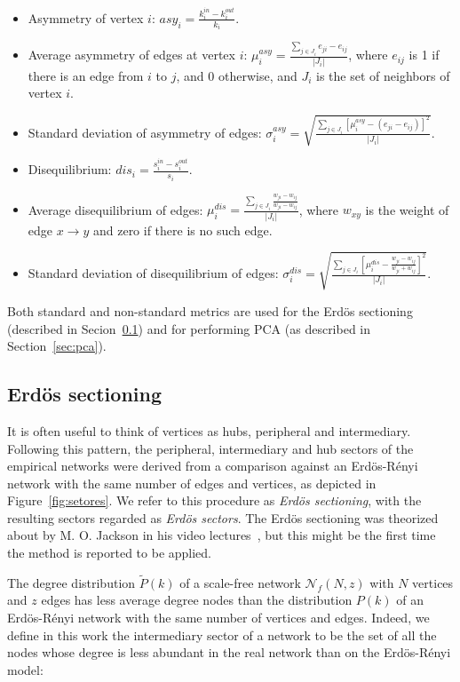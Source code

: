 \documentclass[%
	aip,
	jmp,%
	amsmath,amssymb,
	reprint,%
]{revtex4-1}
\begin{document}
\begin{itemize}
	\item Asymmetry of vertex $i$: $asy_i=\frac{k_i^{in}-k_i^{out}}{k_i}$.
	\item Average asymmetry of edges at vertex $i$: $\mu_i^{asy}=\frac{\sum_{j\in J_i} e_{ji}-e_{ij}}{|J_i|}$, where $e_{ij}$ is 1 if there is an edge from $i$ to $j$, and $0$ otherwise, and $J_i$ is the set of neighbors of vertex $i$.
	\item Standard deviation of asymmetry of edges: $\sigma_i^{asy}=\sqrt{\frac{\sum_{j\in J_i}[\mu^{asy}_i -(e_{ji}-e_{ij}) ]^2  }{|J_i|}  }$.
	\item Disequilibrium: $dis_i=\frac{s_i^{in}-s_i^{out}}{s_i}$.
	\item Average disequilibrium of edges: $\mu_i^{dis}=\frac{\sum_{j \in J_i}\frac{w_{ji}-w_{ij}}{w_{ji}-w_{ij}}}{|J_i|}$, where $w_{xy}$ is the weight of edge $x\rightarrow y$ and zero if there is no such edge.
	\item Standard deviation of disequilibrium of edges: $\sigma_i^{dis}=\sqrt{\frac{\sum_{j\in J_i}\left[\mu^{dis}_i-\frac{w_{ji}-w_{ij}}{w_{ji}+w_{ij}}\right]^2}{|J_i|}}$.
\end{itemize}

Both standard and non-standard metrics are used for the Erd\"os sectioning (described in Secion~\ref{sectioning}) and for performing PCA (as described in Section~\ref{sec:pca}).


\subsection{Erd\"os sectioning}\label{sectioning}
It is often useful to think of
vertices as
hubs, peripheral and intermediary.
Following this pattern,
the peripheral, intermediary and hub sectors of the empirical networks were derived
from a comparison against an Erd\"os-R\'enyi network with the same number of edges and vertices,
as depicted in Figure~\ref{fig:setores}.
We refer to this procedure as \emph{Erd\"os sectioning},
with the resulting sectors regarded as \emph{Erd\"os sectors}.
The Erd\"os sectioning was theorized about by M. O. Jackson in his video lectures~\cite{3setores},
but this might be the first time the method is reported to be applied.

The degree distribution $\widetilde{P}(k)$ of a
scale-free network $\mathcal{N}_f(N,z)$ with $N$ vertices and $z$ edges has less
average degree nodes than the distribution $P(k)$ of an Erd\"os-R\'enyi
network with the same number of vertices and edges. Indeed, we define in this work the intermediary sector of a network to be the set of all the nodes whose degree is less abundant in the real network than on the Erd\"os-R\'enyi model:
\end{document}
